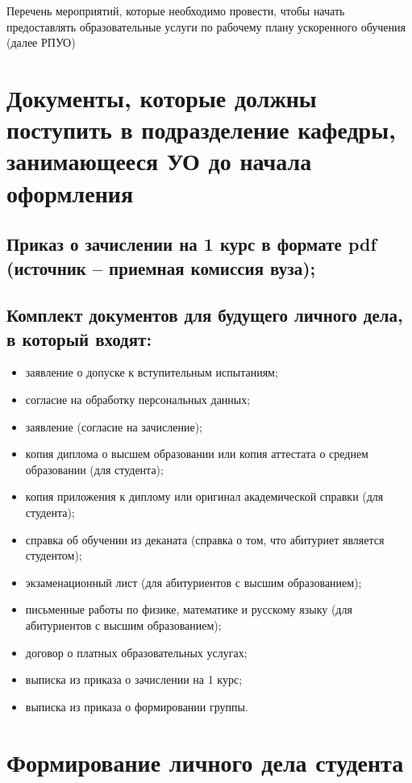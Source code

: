 \documentclass[utf8]{article}
\begin{document}
\begin{flushleft}
\Large Перечень мероприятий, которые необходимо провести, чтобы начать предоставлять образовательные услуги   по рабочему плану ускоренного обучения (далее РПУО)
\section{Документы, которые должны поступить в подразделение кафедры, занимающееся УО до начала оформления}

\subsection{Приказ о зачислении на 1 курс в формате pdf (источник – приемная комиссия вуза);}
\subsection{Комплект документов для будущего личного дела, в который входят: }
\begin{itemize}

\item заявление о допуске к вступительным испытаниям;
\item согласие на обработку персональных данных;
\item заявление (согласие на зачисление);
\item копия диплома о высшем образовании или копия аттестата о среднем образовании (для студента);
\item копия приложения к диплому или оригинал академической справки (для студента); 
\item справка об обучении из деканата (справка о том, что абитуриет является студентом);
\item экзаменационный лист (для абитуриентов с высшим образованием);
\item письменные работы по физике, математике и русскому языку (для абитуриентов с высшим образованием);
\item договор о платных  образовательных услугах;
\item выписка из приказа о зачислении на 1 курс;
\item выписка из приказа о формировании  группы.
\end{itemize}



\section {Формирование личного дела студента} 


\end{flushleft}
\end{document}
